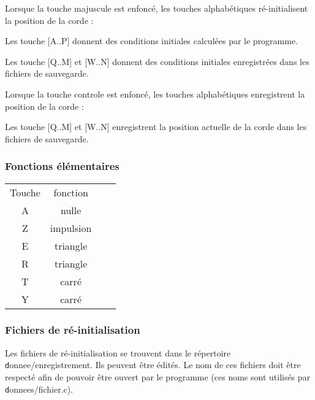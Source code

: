 Lorsque la touche majuscule est enfoncé, les touches alphabétiques ré-initialisent la position de la corde :

Les touche [A..P] donnent des conditions initiales calculées par le programme.

Les touche [Q..M] et [W..N] donnent des conditions initiales enregistrées dans les fichiers de sauvegarde.

Lorsque la touche controle est enfoncé, les touches alphabétiques enregistrent la position de la corde : 

Les touche [Q..M] et [W..N] enregistrent la position actuelle de la corde dans les fichiers de sauvegarde.


%
\subsubsection{Fonctions élémentaires}
%
\begin{center}
\begin{tabular}{cc cc}%
Touche & fonction \\
A & nulle &\\
Z & impulsion &\\
E & triangle&\\
R & triangle&\\
T & carré &\\
Y & carré &\\
\end{tabular}
\end{center}
%
\begin{comment}
\subsubsection{Quanton}
%
\begin{center}
\begin{tabular}{cc cc}%
Touche & fonction \\
U & impulsion &\\
I & impulsion &\\
O & quanton &\\
P & quanton &\\
\end{tabular}
\end{center}
\end{comment}

\subsubsection{Fichiers de ré-initialisation}
Les fichiers de ré-initialisation se trouvent dans le répertoire {\texttt donnee/enregistrement}. Ils peuvent être édités. Le nom de ces fichiers doit être respecté afin de pouvoir être ouvert par le programme (ces noms sont utilisés par {\texttt donnees/fichier.c}).
%
%

